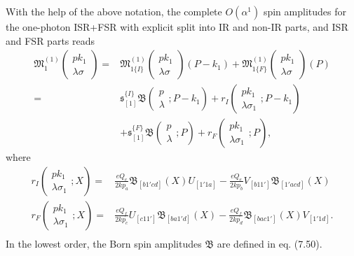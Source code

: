 With the help of the above notation, the complete $O(\alpha^1)$ spin amplitudes for the one-photon ISR+FSR with explicit split into IR and non-IR parts, and ISR and FSR parts reads
\begin{align}
\mathfrak{M}^{(1)}_1\left(
\begin{array}{c}
pk_1\\\lambda\sigma
\end{array}\right)=&\mathfrak{M}^{(1)}_{1\{I\}}\left(
\begin{array}{c}
pk_1\\\lambda\sigma
\end{array}\right)(P-k_1)+\mathfrak{M}^{(1)}_{1\{F\}}\left(
\begin{array}{c}
pk_1\\\lambda\sigma
\end{array}\right)(P)\nonumber\\
=&\mathfrak{s}_{[1]}^{\{I\}}\mathfrak{B}\left(\begin{array}{c}
p\\\lambda
\end{array};P-k_1\right)+r_{I}\left(\begin{array}{c}
pk_1\\\lambda\sigma_1
\end{array};P-k_1\right)\nonumber\\
&+\mathfrak{s}_{[1]}^{\{F\}}\mathfrak{B}\left(\begin{array}{c}
p\\\lambda
\end{array};P\right)+r_{F}\left(\begin{array}{c}
pk_1\\\lambda\sigma_1
\end{array};P\right),
\end{align}
where
\begin{align}
r_{I}\left(\begin{array}{c}
pk_1\\\lambda\sigma_1
\end{array};X\right)=&\frac{eQ_e}{2kp_a}\mathfrak{B}_{[b1'cd]}(X)U_{[1'1a]}-\frac{eQ_e}{2kp_b}V_{[b11']}\mathfrak{B}_{[1'acd]}(X)\nonumber\\
r_{F}\left(\begin{array}{c}
pk_1\\\lambda\sigma_1
\end{array};X\right)=&\frac{eQ_f}{2kp_c}U_{[c11']}\mathfrak{B}_{[ba1'd]}(X)-\frac{eQ_f}{2kp_d}\mathfrak{B}_{[bac1']}(X)V_{[1'1d]}.\nonumber\\
\end{align}
In the lowest order, the Born spin amplitudes $\mathfrak{B}$ are defined in eq. (7.50).


